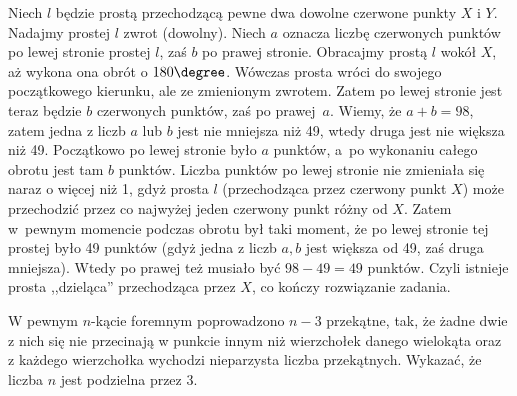 \vspace{10px}
\noindent
 Niech $l$ będzie prostą przechodzącą pewne dwa dowolne czerwone punkty $X$ i $Y$. Nadajmy prostej $l$ zwrot (dowolny). Niech $a$ oznacza liczbę czerwonych punktów po lewej stronie prostej $l$, zaś $b$ po prawej stronie. Obracajmy prostą $l$ wokół $X$, aż wykona ona obrót o $180\degree$. Wówczas prosta wróci do swojego początkowego kierunku, ale ze zmienionym zwrotem. Zatem po lewej stronie jest teraz będzie $b$ czerwonych punktów, zaś po prawej~$a$. Wiemy, że $a+b=98$, zatem jedna z liczb $a$ lub $b$ jest nie mniejsza niż 49, wtedy druga jest nie większa niż 49. Początkowo po lewej stronie było $a$ punktów, a~po wykonaniu całego obrotu jest tam $b$ punktów. Liczba punktów po lewej stronie nie zmieniała się naraz o więcej niż 1, gdyż prosta $l$ (przechodząca przez czerwony punkt $X$) może przechodzić przez co najwyżej jeden czerwony punkt różny od $X$. Zatem w~pewnym momencie podczas obrotu był taki moment, że po lewej stronie tej prostej było 49 punktów (gdyż jedna z liczb $a, b$ jest większa od 49, zaś druga mniejsza). Wtedy po prawej też musiało być $98-49=49$ punktów. Czyli istnieje prosta ,,dzieląca'' przechodząca przez $X$, co kończy rozwiązanie zadania.

 \vspace{5px}

 
\begin{problem}{5}
	W pewnym $n$-kącie foremnym poprowadzono $n - 3$ przekątne, tak, że żadne dwie z nich się nie przecinają w punkcie innym niż wierzchołek danego wielokąta oraz z każdego wierzchołka wychodzi nieparzysta liczba przekątnych. Wykazać, że liczba $n$ jest podzielna przez $3$.
\end{problem}


\begin{center}
\end{center}

